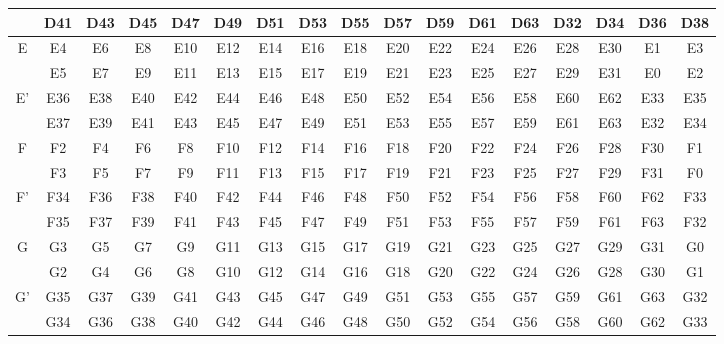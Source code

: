 \documentclass[journal,comsoc]{IEEEtran}
\begin{document}
\begin{small}
\begin{table}
\begin{threeparttable}
\begin{tabular}{|c||cccccccccccccccc|}
			& D41 & D43 & D45 & D47 & D49 & D51 & D53 & D55 & D57 & D59 & D61 & D63 & D32 & D34 & D36 & D38 \\  
			\hline
			\multirow{2}{*}{E} & E4 & E6 & E8 & E10 & E12 & E14 & E16 & E18 & E20 & E22 & E24 & E26 & E28 & E30 & E1 & E3 \\  
			& E5 & E7 & E9 & E11 & E13 & E15 & E17 & E19 & E21 & E23 & E25 & E27 & E29 & E31 & E0 & E2 \\  
			\hline
			\multirow{2}{*}{E'} & E36 & E38 & E40 & E42 & E44 & E46 & E48 & E50 & E52 & E54 & E56 & E58 & E60 & E62 & E33 & E35 \\  
			& E37 & E39 & E41 & E43 & E45 & E47 & E49 & E51 & E53 & E55 & E57 & E59 & E61 & E63 & E32 & E34 \\  
			\hline
			\multirow{2}{*}{F} & F2 & F4 & F6 & F8 & F10 & F12 & F14 & F16 & F18 & F20 & F22 & F24 & F26 & F28 & F30 & F1 \\  
			& F3 & F5 & F7 & F9 & F11 & F13 & F15 & F17 & F19 & F21 & F23 & F25 & F27 & F29 & F31 & F0 \\  
			\hline
			\multirow{2}{*}{F'} & F34 & F36 & F38 & F40 & F42 & F44 & F46 & F48 & F50 & F52 & F54 & F56 & F58 & F60 & F62 & F33 \\  
			& F35 & F37 & F39 & F41 & F43 & F45 & F47 & F49 & F51 & F53 & F55 & F57 & F59 & F61 & F63 & F32 \\  
			\hline
			\multirow{2}{*}{G} & G3 & G5 & G7 & G9 & G11 & G13 & G15 & G17 & G19 & G21 & G23 & G25 & G27 & G29 & G31 & G0 \\  
			& G2 & G4 & G6 & G8 & G10 & G12 & G14 & G16 & G18 & G20 & G22 & G24 & G26 & G28 & G30 & G1 \\  
			\hline
			\multirow{2}{*}{G'} & G35 & G37 & G39 & G41 & G43 & G45 & G47 & G49 & G51 & G53 & G55 & G57 & G59 & G61 & G63 & G32 \\  
			& G34 & G36 & G38 & G40 & G42 & G44 & G46 & G48 & G50 & G52 & G54 & G56 & G58 & G60 & G62 & G33 \\
			\hline
		\end{tabular}
		\label{tab:fold_set_128}	
	\end{threeparttable}
\end{table}
\end{small}
\end{document}

